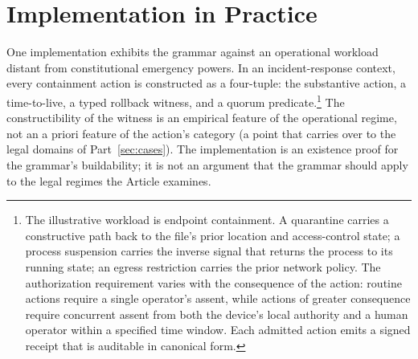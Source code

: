 \section{Implementation in Practice}
\label{sec:implementation}

One implementation exhibits the grammar against an operational workload distant from constitutional emergency powers.
In an incident-response context, every containment action is constructed as a four-tuple:
the substantive action, a time-to-live, a typed rollback witness, and a quorum predicate.\footnote{The
illustrative workload is endpoint containment.
A quarantine carries a constructive path back to the file's prior location and access-control state;
a process suspension carries the inverse signal that returns the process to its running state;
an egress restriction carries the prior network policy.
The authorization requirement varies with the consequence of the action: routine actions
require a single operator's assent, while actions of greater consequence require concurrent
assent from both the device's local authority and a human operator within a specified time window.
Each admitted action emits a signed receipt that is auditable in canonical form.}
The constructibility of the witness is an empirical feature of the operational regime,
not an a priori feature of the action's category (a point that carries over to the legal domains of Part~\ref{sec:cases}).
The implementation is an existence proof for the grammar's buildability;
it is not an argument that the grammar should apply to the legal regimes the Article examines.
